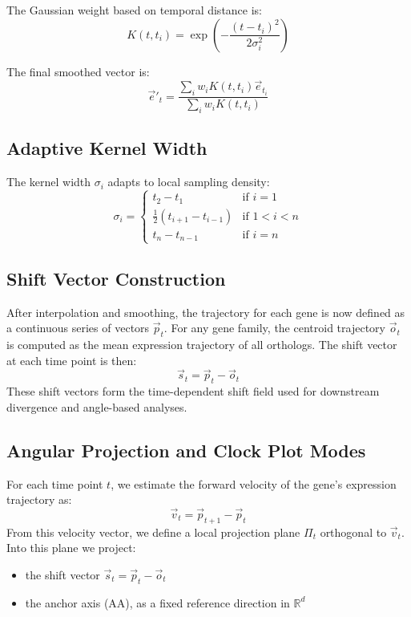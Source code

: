 \documentclass{article}
\begin{document}
The Gaussian weight based on temporal distance is:
\[
K(t, t_i) = \exp\left( -\frac{(t - t_i)^2}{2\sigma_i^2} \right)
\]

The final smoothed vector is:
\[
\vec{e}'_t = \frac{\sum_i w_i K(t, t_i) \vec{e}_{t_i}}{\sum_i w_i K(t, t_i)}
\]

\subsection{Adaptive Kernel Width}

The kernel width \( \sigma_i \) adapts to local sampling density:
\[
\sigma_i =
\begin{cases}
t_2 - t_1 & \text{if } i = 1 \\
\frac{1}{2}(t_{i+1} - t_{i-1}) & \text{if } 1 < i < n \\
t_n - t_{n-1} & \text{if } i = n
\end{cases}
\]

\subsection{Shift Vector Construction}

After interpolation and smoothing, the trajectory for each gene is now defined as a continuous series of vectors \( \vec{p}_t \). For any gene family, the centroid trajectory \( \vec{o}_t \) is computed as the mean expression trajectory of all orthologs. The shift vector at each time point is then:
\[
\vec{s}_t = \vec{p}_t - \vec{o}_t
\]
These shift vectors form the time-dependent shift field used for downstream divergence and angle-based analyses.

\subsection{Angular Projection and Clock Plot Modes}

For each time point \( t \), we estimate the forward velocity of the gene's expression trajectory as:
\[
\vec{v}_t = \vec{p}_{t+1} - \vec{p}_t
\]
From this velocity vector, we define a local projection plane \( \Pi_t \) orthogonal to \( \vec{v}_t \). Into this plane we project:

\begin{itemize}
    \item the shift vector \( \vec{s}_t = \vec{p}_t - \vec{o}_t \)
    \item the anchor axis (AA), as a fixed reference direction in \( \mathbb{R}^d \)
\end{itemize}
\end{document}
